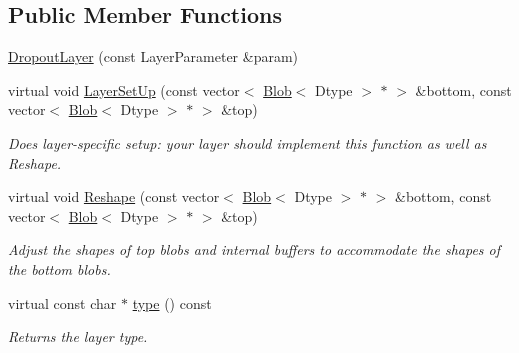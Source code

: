 \subsection*{Public Member Functions}
\begin{DoxyCompactItemize}
\item 
\hyperlink{classcaffe_1_1DropoutLayer_a24cbddd4699b102a9555d3b8013c16d0}{Dropout\+Layer} (const Layer\+Parameter \&param)
\item 
virtual void \hyperlink{classcaffe_1_1DropoutLayer_a82bcd23115526808c79c807686945145}{Layer\+Set\+Up} (const vector$<$ \hyperlink{classcaffe_1_1Blob}{Blob}$<$ Dtype $>$ $\ast$ $>$ \&bottom, const vector$<$ \hyperlink{classcaffe_1_1Blob}{Blob}$<$ Dtype $>$ $\ast$ $>$ \&top)
\begin{DoxyCompactList}\small\item\em Does layer-\/specific setup\+: your layer should implement this function as well as Reshape. \end{DoxyCompactList}\item 
virtual void \hyperlink{classcaffe_1_1DropoutLayer_a3d5bce578b44ba2a89c1d4f7205ed842}{Reshape} (const vector$<$ \hyperlink{classcaffe_1_1Blob}{Blob}$<$ Dtype $>$ $\ast$ $>$ \&bottom, const vector$<$ \hyperlink{classcaffe_1_1Blob}{Blob}$<$ Dtype $>$ $\ast$ $>$ \&top)
\begin{DoxyCompactList}\small\item\em Adjust the shapes of top blobs and internal buffers to accommodate the shapes of the bottom blobs. \end{DoxyCompactList}\item 
virtual const char $\ast$ \hyperlink{classcaffe_1_1DropoutLayer_a73b1eba29e00cea48e1faaf9818b5dba}{type} () const \hypertarget{classcaffe_1_1DropoutLayer_a73b1eba29e00cea48e1faaf9818b5dba}{}\label{classcaffe_1_1DropoutLayer_a73b1eba29e00cea48e1faaf9818b5dba}

\begin{DoxyCompactList}\small\item\em Returns the layer type. \end{DoxyCompactList}\end{DoxyCompactItemize}
